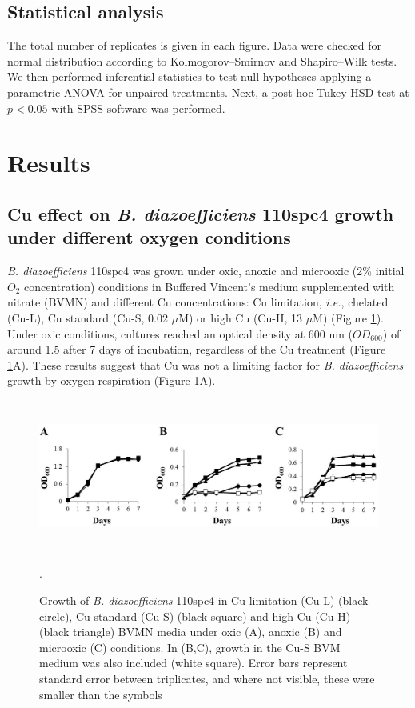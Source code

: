 \documentclass[a4paper,11pt]{article}
\begin{document}
\subsection{Statistical analysis}
The total number of replicates is given in each figure. Data were checked for normal
distribution according to Kolmogorov–Smirnov and Shapiro–Wilk tests. We then performed
inferential statistics to test null hypotheses applying a parametric ANOVA for unpaired
treatments. Next, a post-hoc Tukey HSD test at $p<0.05$ with SPSS software was performed.

\section{Results}
\subsection{Cu effect on {\em B. diazoefficiens} 110spc4 growth under different oxygen conditions}
{\em B. diazoefficiens} 110spc4 was grown under oxic, anoxic and microoxic (2\% initial $O_2$
concentration) conditions in Buffered Vincent’s medium \cite{serventi2012copper} supplemented with nitrate
(BVMN) and different Cu concentrations: Cu limitation, {\em i.e.}, chelated (Cu-L), Cu standard
(Cu-S, 0.02 $\mu$M) or high Cu (Cu-H, 13 $\mu$M) (Figure \ref{fig:figure1}). Under oxic conditions, cultures
reached an optical density at 600 nm ($OD_600$) of around 1.5 after 7 days of incubation,
regardless of the Cu treatment (Figure \ref{fig:figure1}A). These results suggest that Cu was not a limiting
factor for {\em B. diazoefficiens} growth by oxygen respiration (Figure \ref{fig:figure1}A). 
\begin{figure}[h!]
\centering
\includegraphics[height=5cm]{Images/Figure1.jpg}
\caption{Growth of {\em B. diazoefficiens} 110spc4 in Cu limitation (Cu-L) (black circle), Cu standard (Cu-S) (black square) and
high Cu (Cu-H) (black triangle) BVMN media under oxic (A), anoxic (B) and microoxic (C) conditions. In (B,C),
growth in the Cu-S BVM medium was also included (white square). Error bars represent standard error between
triplicates, and where not visible, these were smaller than the symbols}.
\label{fig:figure1}
\end{figure}
\end{document}
